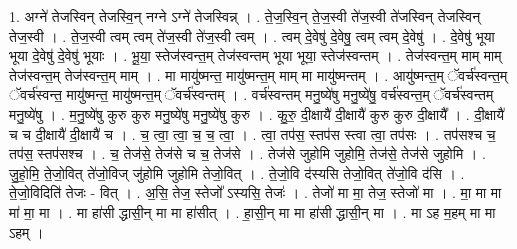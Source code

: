 \documentclass[17pt]{extarticle}
\begin{document}
1. अग्ने॑ तेजस्विन् तेजस्वि॒न् नग्ने ऽग्ने॑ तेजस्विन्न् । . ते॒ज॒स्वि॒न् ते॒ज॒स्वी ते॑ज॒स्वी ते॑जस्विन् तेजस्विन् तेज॒स्वी । . ते॒ज॒स्वी त्वम् त्वम् ते॑ज॒स्वी ते॑ज॒स्वी त्वम् । . त्वम् दे॒वेषु॑ दे॒वेषु॒ त्वम् त्वम् दे॒वेषु॑ । . दे॒वेषु॑ भूया भूया दे॒वेषु॑ दे॒वेषु॑ भूयाः । . भू॒या॒ स्तेज॑स्वन्त॒म् तेज॑स्वन्तम् भूया भूया॒ स्तेज॑स्वन्तम् । . तेज॑स्वन्त॒म् माम् माम् तेज॑स्वन्त॒म् तेज॑स्वन्त॒म् माम् । . मा मायु॑ष्मन्त॒ मायु॑ष्मन्त॒म् माम् मा मायु॑ष्मन्तम् । . आयु॑ष्मन्त॒म् ॅवर्च॑स्वन्त॒म् ॅवर्च॑स्वन्त॒ मायु॑ष्मन्त॒ मायु॑ष्मन्त॒म् ॅवर्च॑स्वन्तम् । . वर्च॑स्वन्तम् मनु॒ष्ये॑षु मनु॒ष्ये॑षु॒ वर्च॑स्वन्त॒म् ॅवर्च॑स्वन्तम् मनु॒ष्ये॑षु । . म॒नु॒ष्ये॑षु कुरु कुरु मनु॒ष्ये॑षु मनु॒ष्ये॑षु कुरु । . कु॒रु॒ दी॒क्षायै॑ दी॒क्षायै॑ कुरु कुरु दी॒क्षायै᳚ । . दी॒क्षायै॑ च च दी॒क्षायै॑ दी॒क्षायै॑ च । . च॒ त्वा॒ त्वा॒ च॒ च॒ त्वा॒ । . त्वा॒ तप॑स॒ स्तप॑स स्त्वा त्वा॒ तप॑सः । . तप॑सश्च च॒ तप॑स॒ स्तप॑सश्च । . च॒ तेज॑से॒ तेज॑से च च॒ तेज॑से । . तेज॑से जुहोमि जुहोमि॒ तेज॑से॒ तेज॑से जुहोमि । . जु॒हो॒मि॒ ते॒जो॒वित् ते॑जो॒विज् जु॑होमि जुहोमि तेजो॒वित् । . ते॒जो॒वि द॑स्यसि तेजो॒वित् ते॑जो॒वि द॑सि । . ते॒जो॒विदिति॑ तेजः - वित् । . अ॒सि॒ तेज॒ स्तेजो᳚ ऽस्यसि॒ तेजः॑ । . तेजो॑ मा मा॒ तेज॒ स्तेजो॑ मा । . मा॒ मा मा मा॑ मा॒ मा । . मा हा॑सी द्धासी॒न् मा मा हा॑सीत् । . हा॒सी॒न् मा मा हा॑सी द्धासी॒न् मा । . मा ऽह म॒हम् मा मा ऽहम् । \newline
\end{document}
